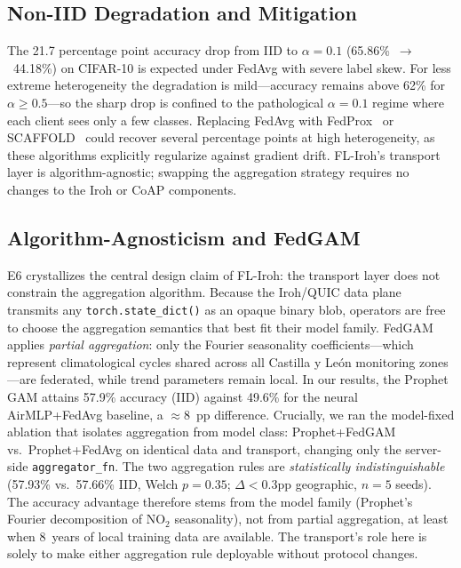\documentclass[a4paper,fleqn]{cas-dc}
\begin{document}
\subsection{Non-IID Degradation and Mitigation}

The 21.7 percentage point accuracy drop from IID to $\alpha{=}0.1$ (65.86\%~$\to$~44.18\%) on CIFAR-10 is expected under FedAvg with severe label skew. For less extreme heterogeneity the degradation is mild---accuracy remains above 62\% for $\alpha{\geq}0.5$---so the sharp drop is confined to the pathological $\alpha{=}0.1$ regime where each client sees only a few classes. Replacing FedAvg with FedProx~\cite{fedprox2020} or SCAFFOLD~\cite{scaffold2020} could recover several percentage points at high heterogeneity, as these algorithms explicitly regularize against gradient drift. FL-Iroh's transport layer is algorithm-agnostic; swapping the aggregation strategy requires no changes to the Iroh or CoAP components.

\subsection{Algorithm-Agnosticism and FedGAM}

E6 crystallizes the central design claim of FL-Iroh: the transport layer does not constrain the aggregation algorithm. Because the Iroh/QUIC data plane transmits any \texttt{torch.state\_dict()} as an opaque binary blob, operators are free to choose the aggregation semantics that best fit their model family. FedGAM applies \emph{partial aggregation}: only the Fourier seasonality coefficients---which represent climatological cycles shared across all Castilla y Le\'on monitoring zones---are federated, while trend parameters remain local. In our results, the Prophet GAM attains 57.9\% accuracy (IID) against 49.6\% for the neural AirMLP+FedAvg baseline, a $\approx$8~pp difference. Crucially, we ran the model-fixed ablation that isolates aggregation from model class: Prophet+FedGAM vs.~Prophet+FedAvg on identical data and transport, changing only the server-side \texttt{aggregator\_fn}. The two aggregation rules are \emph{statistically indistinguishable} (57.93\% vs.~57.66\% IID, Welch $p{=}0.35$; $\Delta{<}0.3$pp geographic, $n{=}5$ seeds). The accuracy advantage therefore stems from the model family (Prophet's Fourier decomposition of NO$_2$ seasonality), not from partial aggregation, at least when 8~years of local training data are available. The transport's role here is solely to make either aggregation rule deployable without protocol changes.
\end{document}
